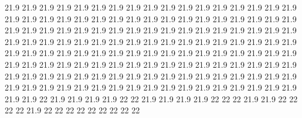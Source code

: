 21.9
21.9
21.9
21.9
21.9
21.9
21.9
21.9
21.9
21.9
21.9
21.9
21.9
21.9
21.9
21.9
21.9
21.9
21.9
21.9
21.9
21.9
21.9
21.9
21.9
21.9
21.9
21.9
21.9
21.9
21.9
21.9
21.9
21.9
21.9
21.9
21.9
21.9
21.9
21.9
21.9
21.9
21.9
21.9
21.9
21.9
21.9
21.9
21.9
21.9
21.9
21.9
21.9
21.9
21.9
21.9
21.9
21.9
21.9
21.9
21.9
21.9
21.9
21.9
21.9
21.9
21.9
21.9
21.9
21.9
21.9
21.9
21.9
21.9
21.9
21.9
21.9
21.9
21.9
21.9
21.9
21.9
21.9
21.9
21.9
21.9
21.9
21.9
21.9
21.9
21.9
21.9
21.9
21.9
21.9
21.9
21.9
21.9
21.9
21.9
21.9
21.9
21.9
21.9
21.9
21.9
21.9
21.9
21.9
21.9
21.9
21.9
21.9
21.9
21.9
21.9
21.9
21.9
21.9
21.9
21.9
21.9
21.9
21.9
21.9
21.9
21.9
21.9
21.9
21.9
21.9
21.9
21.9
21.9
21.9
21.9
21.9
21.9
22
21.9
21.9
21.9
21.9
22
22
21.9
21.9
21.9
21.9
22
22
22
21.9
21.9
22
22
22
22
21.9
22
22
22
22
22
22
22
22
22
